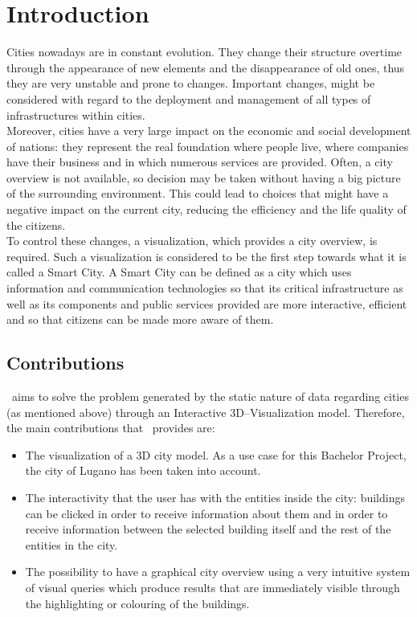 \section{Introduction} \label{introduction}
Cities nowadays are in constant evolution. They change their structure overtime through the appearance of new elements and the disappearance of old ones, thus they are very unstable and prone to changes. Important changes, might be considered with regard to the deployment and management of all types of infrastructures within cities.\\

Moreover, cities have a very large impact on the economic and social development of nations: they represent the real foundation where people live, where companies have their business and in which numerous services are provided. Often, a city overview is not available, so decision may be taken without having a big picture of the surrounding environment. This could lead to choices that might have a negative impact on the current city, reducing the efficiency and the life quality of the citizens.\\

To control these changes, a visualization, which provides a city overview, is required. Such a visualization is considered to be the first step towards what it is called a Smart City. A Smart City can be defined as a city which uses information and communication technologies so that its critical infrastructure as well as its components and public services provided are more interactive, efficient and so that citizens can be made more aware of them.
\subsection{Contributions}
\applicationName\ aims to solve the problem generated by the static nature of data regarding cities (as mentioned above) through an Interactive 3D--Visualization model. Therefore, the main contributions that \applicationName\ provides are:
\begin{itemize}
	\item The visualization of a 3D city model. As a use case for this Bachelor Project, the city of Lugano has been taken into account.
	\item The interactivity that the user has with the entities inside the city: buildings can be clicked in order to receive information about them and in order to receive information between the selected building itself and the rest of the entities in the city.
	\item The possibility to have a graphical city overview using a very intuitive system of visual queries which produce results that are immediately visible through the highlighting or colouring of the buildings. 
\end{itemize} 
